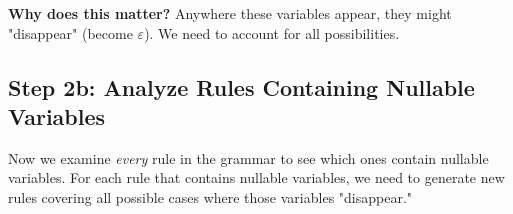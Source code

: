 {{{{{{{{{{%
\noindent\textbf{Why does this matter?} Anywhere these variables appear, they might "disappear" (become $\varepsilon$). We need to account for all possibilities.
{%

\subsection{Step 2b: Analyze Rules Containing Nullable Variables}

Now we examine \textit{every} rule in the grammar to see which ones contain nullable variables. For each rule that contains nullable variables, we need to generate new rules covering all possible cases where those variables "disappear."

\vspace{0.3cm}

{%
{%

{%

}}}}}}}}}}}}}}
